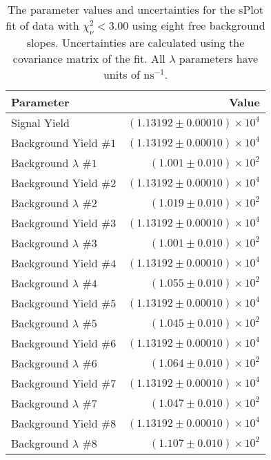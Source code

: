 
\begin{table}[ht]
    \begin{center}
        \begin{tabular}{lr}\toprule
            Parameter & Value \\\midrule
            Signal Yield & $(1.13192 \pm 0.00010) \times 10^{4}$ \\
            Background Yield $\#1$ & $(1.13192 \pm 0.00010) \times 10^{4}$ \\
            Background $\lambda$ $\#1$ & $(1.001 \pm 0.010) \times 10^{2}$ \\
            Background Yield $\#2$ & $(1.13192 \pm 0.00010) \times 10^{4}$ \\
            Background $\lambda$ $\#2$ & $(1.019 \pm 0.010) \times 10^{2}$ \\
            Background Yield $\#3$ & $(1.13192 \pm 0.00010) \times 10^{4}$ \\
            Background $\lambda$ $\#3$ & $(1.001 \pm 0.010) \times 10^{2}$ \\
            Background Yield $\#4$ & $(1.13192 \pm 0.00010) \times 10^{4}$ \\
            Background $\lambda$ $\#4$ & $(1.055 \pm 0.010) \times 10^{2}$ \\
            Background Yield $\#5$ & $(1.13192 \pm 0.00010) \times 10^{4}$ \\
            Background $\lambda$ $\#5$ & $(1.045 \pm 0.010) \times 10^{2}$ \\
            Background Yield $\#6$ & $(1.13192 \pm 0.00010) \times 10^{4}$ \\
            Background $\lambda$ $\#6$ & $(1.064 \pm 0.010) \times 10^{2}$ \\
            Background Yield $\#7$ & $(1.13192 \pm 0.00010) \times 10^{4}$ \\
            Background $\lambda$ $\#7$ & $(1.047 \pm 0.010) \times 10^{2}$ \\
            Background Yield $\#8$ & $(1.13192 \pm 0.00010) \times 10^{4}$ \\
            Background $\lambda$ $\#8$ & $(1.107 \pm 0.010) \times 10^{2}$ \\\bottomrule
        \end{tabular}
        \caption{The parameter values and uncertainties for the sPlot fit of data with $\chi^2_\nu < 3.00$ using eight free background slopes. Uncertainties are calculated using the covariance matrix of the fit. All $\lambda$ parameters have units of $\si{\nano\second}^{-1}$.}\label{tab:splot-fit-results-chisqdof-3.00-free-8}
    \end{center}
\end{table}
